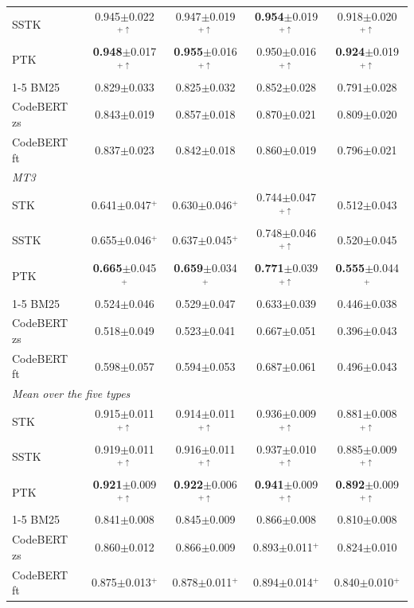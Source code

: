 \begin{table}[!htbp]
\begin{tabular}{lcccc}
\quad SSTK & 0.945$\pm$0.022$^{+\uparrow}$ & 0.947$\pm$0.019$^{+\uparrow}$ & \textbf{0.954}$\pm$0.019$^{+\uparrow}$ & 0.918$\pm$0.020$^{+\uparrow}$ \\
\quad PTK & \textbf{0.948}$\pm$0.017$^{+\uparrow}$ & \textbf{0.955}$\pm$0.016$^{+\uparrow}$ & 0.950$\pm$0.016$^{+\uparrow}$ & \textbf{0.924}$\pm$0.019$^{+\uparrow}$ \\
\cmidrule(lr){1-5}
\quad BM25 & 0.829$\pm$0.033 & 0.825$\pm$0.032 & 0.852$\pm$0.028 & 0.791$\pm$0.028 \\
\quad CodeBERT zs & 0.843$\pm$0.019 & 0.857$\pm$0.018 & 0.870$\pm$0.021 & 0.809$\pm$0.020 \\
\quad CodeBERT ft & 0.837$\pm$0.023 & 0.842$\pm$0.018 & 0.860$\pm$0.019 & 0.796$\pm$0.021 \\
\midrule
\multicolumn{5}{l}{\emph{MT3}} \\
\quad STK & 0.641$\pm$0.047$^{+}$ & 0.630$\pm$0.046$^{+}$ & 0.744$\pm$0.047$^{+\uparrow}$ & 0.512$\pm$0.043 \\
\quad SSTK & 0.655$\pm$0.046$^{+}$ & 0.637$\pm$0.045$^{+}$ & 0.748$\pm$0.046$^{+\uparrow}$ & 0.520$\pm$0.045 \\
\quad PTK & \textbf{0.665}$\pm$0.045$^{+}$ & \textbf{0.659}$\pm$0.034$^{+}$ & \textbf{0.771}$\pm$0.039$^{+\uparrow}$ & \textbf{0.555}$\pm$0.044$^{+}$ \\
\cmidrule(lr){1-5}
\quad BM25 & 0.524$\pm$0.046 & 0.529$\pm$0.047 & 0.633$\pm$0.039 & 0.446$\pm$0.038 \\
\quad CodeBERT zs & 0.518$\pm$0.049 & 0.523$\pm$0.041 & 0.667$\pm$0.051 & 0.396$\pm$0.043 \\
\quad CodeBERT ft & 0.598$\pm$0.057 & 0.594$\pm$0.053 & 0.687$\pm$0.061 & 0.496$\pm$0.043 \\
\midrule
\multicolumn{5}{l}{\emph{Mean over the five types}} \\
\quad STK & 0.915$\pm$0.011$^{+\uparrow}$ & 0.914$\pm$0.011$^{+\uparrow}$ & 0.936$\pm$0.009$^{+\uparrow}$ & 0.881$\pm$0.008$^{+\uparrow}$ \\
\quad SSTK & 0.919$\pm$0.011$^{+\uparrow}$ & 0.916$\pm$0.011$^{+\uparrow}$ & 0.937$\pm$0.010$^{+\uparrow}$ & 0.885$\pm$0.009$^{+\uparrow}$ \\
\quad PTK & \textbf{0.921}$\pm$0.009$^{+\uparrow}$ & \textbf{0.922}$\pm$0.006$^{+\uparrow}$ & \textbf{0.941}$\pm$0.009$^{+\uparrow}$ & \textbf{0.892}$\pm$0.009$^{+\uparrow}$ \\
\cmidrule(lr){1-5}
\quad BM25 & 0.841$\pm$0.008 & 0.845$\pm$0.009 & 0.866$\pm$0.008 & 0.810$\pm$0.008 \\
\quad CodeBERT zs & 0.860$\pm$0.012 & 0.866$\pm$0.009 & 0.893$\pm$0.011$^{+}$ & 0.824$\pm$0.010 \\
\quad CodeBERT ft & 0.875$\pm$0.013$^{+}$ & 0.878$\pm$0.011$^{+}$ & 0.894$\pm$0.014$^{+}$ & 0.840$\pm$0.010$^{+}$ \\
\bottomrule
\end{tabular}
\end{table}
